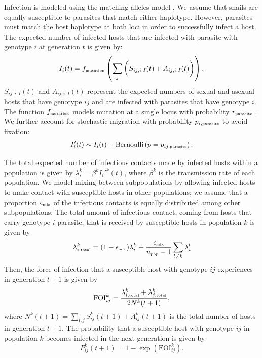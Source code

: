 \documentclass{article}\usepackage[]{graphicx}\usepackage[]{color}
\begin{document}
Infection is modeled using the matching alleles model \citep{otto1998evolution}.
We assume that snails are equally susceptible to parasites that match either haplotype.
However, parasites must match the host haplotype at both loci in order to successfully infect a host.
The expected number of infected hosts that are infected with parasite with genotype $i$ at generation $t$ is given by:
\begin{equation}
I_{i}(t) = f_{\textrm{\tiny mutation}} \left( \sum_{j}  \bigg( S_{ij,i,I}(t) + A_{ij,i,I}(t)\bigg)\right).
\end{equation}
$S_{ij,i,I}(t)$ and $A_{ij,i,I}(t)$ represent the expected numbers of sexual and asexual hosts that have genotype $ij$ and are infected with parasites that have genotype $i$.
The function $f_{\textrm{\tiny mutation}}$ models mutation at a single locus with probability $r_{\textrm{\tiny parasite}}$ \citep{ashby2015diversity}. 
We further account for stochastic migration with probability $p_{i, \textrm{\tiny parasite}}$ to avoid fixation:
\begin{equation}
I_{i}'(t) \sim I_i(t) + \mathrm{Bernoulli}\left(p=p_{ij, \textrm{\tiny parasite}}\right).
\end{equation}


The total expected number of infectious contacts made by infected hosts within a population is given by $\lambda_i^k = \beta^k {I_i'}^k(t)$, where $\beta^k$ is the transmission rate of each population. 
We model mixing between subpopulations by allowing infected hosts to make contact with susceptible hosts in other populations;
we assume that a proportion $\epsilon_{\textrm{\tiny mix}}$ of the infectious contacts is equally distributed among other subpopulations.
The total amount of infectious contact, coming from hosts that carry genotype $i$ parasite, that is received by susceptible hosts in population $k$ is given by
\begin{equation}
\lambda_{i, \textrm{\tiny total}}^k = (1 - \epsilon_{\textrm{\tiny mix}}) \lambda_i^k + \frac{\epsilon_{\textrm{\tiny mix}}}{n_\textrm{\tiny pop}-1} \sum_{l \neq k} \lambda_i^l
\end{equation}
Then, the force of infection that a susceptible host with genotype $ij$ experiences in generation $t+1$ is given by
\begin{equation}
\mathrm{FOI}_{ij}^k = \frac{\lambda_{i, \textrm{\tiny total}}^k  + \lambda_{j, \textrm{\tiny total}}^k}{2 N^k(t+1)},
\end{equation}
where $N^k(t+1) = \sum_{i,j} S_{ij}^k(t+1) + A_{ij}^k(t+1)$ is the total number of hosts in generation $t+1$.
The probability that a susceptible host with genotype $ij$ in population $k$ becomes infected in the next generation is given by
\begin{equation}
P_{ij}^k(t+1) = 1 - \exp\left(\mathrm{FOI}_{ij}^k\right).
\end{equation}
\end{document}
